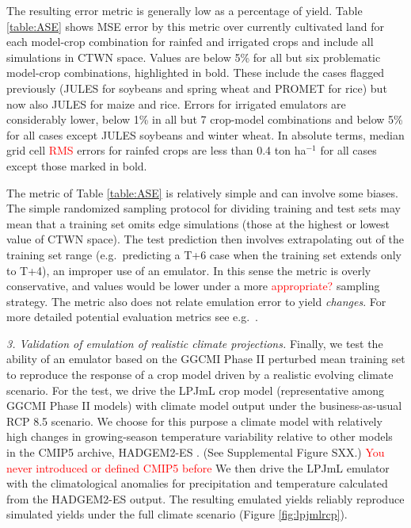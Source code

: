 \documentclass[gmd, manuscript]{copernicus} %
\begin{document}
The resulting error metric is generally low as a percentage of yield.
Table \ref{table:ASE} shows MSE error by this metric over currently cultivated land for each model-crop combination for rainfed and irrigated crops and include all simulations in CTWN space. 
Values are below 5\% for all but six problematic model-crop combinations, highlighted in bold. 
These include the cases flagged previously (JULES for soybeans and spring wheat and PROMET for rice) but now also JULES for maize and rice.
Errors for irrigated emulators are considerably lower, below 1\% in all but 7 crop-model combinations and below 5\% for all cases except JULES soybeans and winter wheat.
In absolute terms, median grid cell \textcolor{red}{RMS} errors for rainfed crops are less than 0.4 ton ha$^{-1}$ for all cases except those marked in bold. %

The metric of Table \ref{table:ASE} is relatively simple and can involve some biases. %
The simple randomized sampling protocol for dividing training and test sets may mean that a training set omits edge simulations (those at the highest or lowest value of CTWN space). 
The test prediction then involves extrapolating out of the training set range (e.g.\ predicting a T+6 case when the training set extends only to T+4), an improper use of an emulator.
In this sense the metric is overly conservative, and values would be lower under a more \textcolor{red}{appropriate?} sampling strategy. The metric also does not relate emulation error to yield \textit{changes}. For more detailed potential evaluation metrics see e.g.\ \citet{Castruccio14}.

\textit{3. Validation of emulation of realistic climate projections.}
\label{S:4.3}
Finally, we test the ability of an emulator based on the GGCMI Phase II perturbed mean training set to reproduce the response of a crop model driven by a realistic evolving climate scenario.
For the test, we drive the LPJmL crop model (representative among GGCMI Phase II models) with climate model output under the business-as-usual RCP 8.5 scenario.
We choose for this purpose a climate model with relatively high changes in growing-season temperature variability relative to other models in the CMIP5 archive, HADGEM2-ES \citep{Jones2011h}. (See Supplemental Figure SXX.) \textcolor{red}{You never introduced or defined CMIP5 before}
 We then drive the LPJmL emulator with the climatological anomalies for precipitation and temperature calculated from the HADGEM2-ES output. The resulting emulated yields reliably reproduce simulated yields under the full climate scenario (Figure \ref{fig:lpjmlrcp}). 
\end{document}
